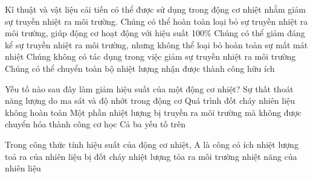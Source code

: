 \begin{ex} 
	Kĩ thuật và vật liệu cải tiến có thể được sử dụng trong động cơ nhiệt nhằm giảm sự truyền nhiệt ra môi trường. 
	\choice
	{Chúng có thể hoàn toàn loại bỏ sự truyền nhiệt ra môi trường, giúp động cơ hoạt động với hiệu suất 100\%}
	{\True Chúng có thể giảm đáng kể sự truyền nhiệt ra môi trường, nhưng không thể loại bỏ hoàn toàn sự mất mát nhiệt}
	{Chúng không có tác dụng trong việc giảm sự truyền nhiệt ra môi trường}
	{Chúng có thể chuyển toàn bộ nhiệt lượng nhận được thành công hữu ích}
\end{ex}

\begin{ex} 
	Yếu tố nào sau đây làm giảm hiệu suất của một động cơ nhiệt?
	\choice
	{Sự thất thoát năng lượng do ma sát và độ nhớt trong động cơ}
	{Quá trình đốt cháy nhiên liệu không hoàn toàn}
	{Một phần nhiệt lượng bị truyền ra môi trường mà không được chuyển hóa thành công cơ học}
	{\True Cả ba yếu tố trên}
\end{ex}


\begin{ex} 
	Trong công thức tính hiệu suất của động cơ nhiệt, A là
	\choice
	{\True công có ích}
	{nhiệt lượng toả ra của nhiên liệu bị đốt cháy}
	{nhiệt lượng tỏa ra môi trường}
	{nhiệt năng của nhiên liệu}
\end{ex}


